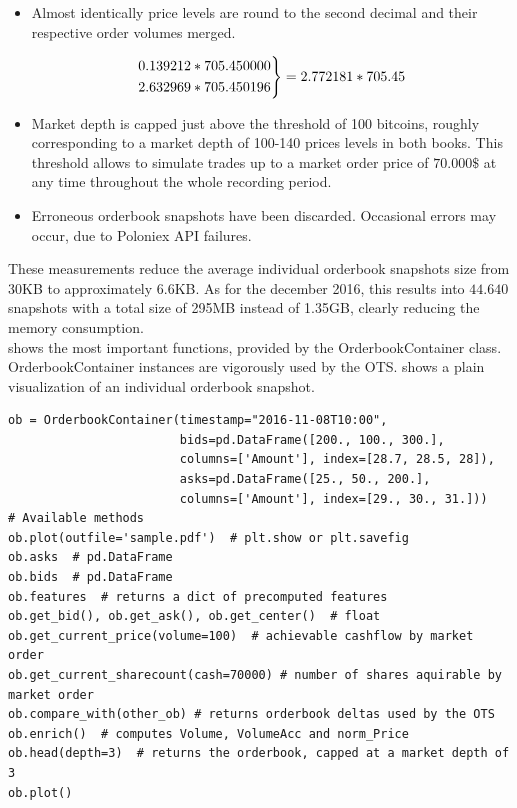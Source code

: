 \begin{itemize}
\item Almost identically price levels are round to the second decimal and their respective order volumes merged.

 \[ 
  \begin{rcases}
    0.139212 * 705.450000\\
    2.632969 * 705.450196\\
  \end{rcases} 
  = 2.772181 * 705.45
\]
\item Market depth is capped just above the threshold of 100 bitcoins, roughly corresponding to a market depth of 100-140 prices levels in both books. This threshold allows to simulate trades up to a market order price of $70.000\$$ at any time throughout the whole recording period.

\item Erroneous orderbook snapshots have been discarded. Occasional errors may occur, due to Poloniex API failures.

\end{itemize}

These measurements reduce the average individual orderbook snapshots size from 30KB to approximately 6.6KB. As for the december 2016, this results into $44.640$ snapshots with a total size of 295MB instead of 1.35GB, clearly reducing the memory consumption.\\

 shows the most important functions, provided by the OrderbookContainer class. OrderbookContainer instances are vigorously used by the \ac{OTS}.  shows a plain visualization of an individual orderbook snapshot.

\begin{lstlisting}[frame=single, breaklines=true, basicstyle=\scriptsize, caption=OrderbookContainer, label=lst:OrderbookContainer]
ob = OrderbookContainer(timestamp="2016-11-08T10:00",
                        bids=pd.DataFrame([200., 100., 300.],
                        columns=['Amount'], index=[28.7, 28.5, 28]),
                        asks=pd.DataFrame([25., 50., 200.],
                        columns=['Amount'], index=[29., 30., 31.]))
# Available methods
ob.plot(outfile='sample.pdf')  # plt.show or plt.savefig
ob.asks  # pd.DataFrame
ob.bids  # pd.DataFrame
ob.features  # returns a dict of precomputed features
ob.get_bid(), ob.get_ask(), ob.get_center()  # float
ob.get_current_price(volume=100)  # achievable cashflow by market order
ob.get_current_sharecount(cash=70000) # number of shares aquirable by market order
ob.compare_with(other_ob) # returns orderbook deltas used by the OTS
ob.enrich()  # computes Volume, VolumeAcc and norm_Price
ob.head(depth=3)  # returns the orderbook, capped at a market depth of 3
ob.plot()
\end{lstlisting}


